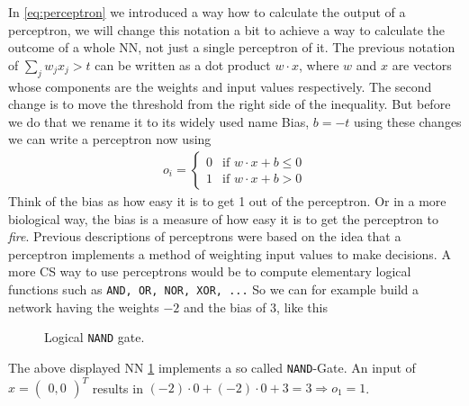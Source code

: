 \documentclass[10pt]{book}
\begin{document}
    In \eqref{eq:perceptron} we introduced a way how to calculate the output of a perceptron, we will change this notation
    a bit to achieve a way to calculate the outcome of a whole NN, not just a single perceptron of it.
    The previous notation of \(\sum_j w_jx_j > t\) can be written as a dot product \(w \cdot x\), where \(w\) and \(x\) are 
    vectors whose components are the weights and input values respectively. The second change is to move the 
    threshold from the right side of the inequality. But before we do that we rename it to its widely used name \dq Bias\dq, \(b = -t\)
    using these changes we can write a perceptron now using
    \begin{align}
        o_i =
        \left\{
            \begin{matrix}
                0 & \text{if } w\cdot x + b \leq 0\\
                1 & \text{if } w\cdot x + b > 0
            \end{matrix}
        \right.
        \label{eq:firstNN}
    \end{align}
    Think of the bias as how easy it is to get 1 out of the perceptron. Or in a more biological
    way, the bias is a measure of how easy it is to get the perceptron to \textit{fire}.\newline
    Previous descriptions of perceptrons were based on the idea that a perceptron implements a method of weighting
    input values to make decisions. A more CS way to use perceptrons would be to compute elementary logical functions
    such as \lstinline{AND, OR, NOR, XOR, ...} So we can for example build a network having the weights \(-2\) and the bias of \(3\), like this 
    \begin{figure}[h]
        \begin{center}
        \end{center}
        \caption{Logical \lstinline{NAND} gate.\label{fig:NANDGate}}
    \end{figure}
    The above displayed NN \ref{fig:NANDGate} implements a so called \lstinline{NAND}-Gate.
    An input of \(x = \begin{pmatrix}0, 0\end{pmatrix}^T\) results in \((-2)\cdot 0 + (-2) \cdot 0 + 3 = 3 \Rightarrow o_1 = 1\).
\end{document}
